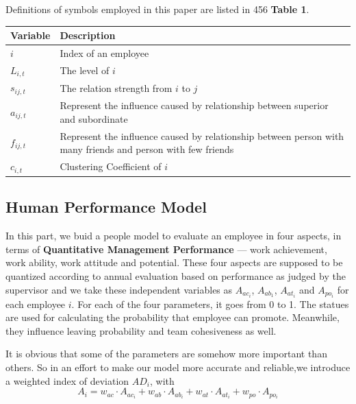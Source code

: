 \documentclass[12pt,a4paper,titlepage]{article}
\begin{document}
Definitions of symbols employed in this paper are listed in 456
\textbf{Table 1}.
\begin{table}
\begin{tabular}{|l|l|}
  Variable & Description \\
  \hline
  $i$            &Index of an employee \\
  $L_{i,t}$          &The level of $i$ \\
  $s_{ij,t}$        &The relation strength from $i$ to $j$ \\
  $a_{ij,t}$        &Represent the influence caused by relationship
                    between superior and subordinate \\
  $f_{ij,t}$        &Represent the influence caused by relationship
                    between person with many friends and person with
                    few friends \\
  $c_{i,t}$        &Clustering Coefficient of $i$
\end{tabular}
\end{table}

\subsection{Human Performance Model}
\label{sec:human-model}

In this part, we buid a people model to evaluate an employee in four
aspects, in terms of \textbf{Quantitative Management Performance} ---
work achievement, work ability, work attitude and potential. These
four aspects are supposed to be quantized according to annual
evaluation based on performance as judged by the supervisor and we
take these independent variables as $A_{ac_i}$, $A_{ab_1}$, $A_{at_i}$
and $A_{po_i}$ for each employee $i$. For each of the four parameters,
it goes from 0 to 1. The statues are used for calculating the
probability that employee can promote. Meanwhile, they influence
leaving probability and team cohesiveness as well.

It is obvious that some of the parameters are somehow more important
than others. So in an effort to make our model more accurate and
reliable,we introduce a weighted index of deviation $AD_i$, with
\begin{equation}
  A_i=w_{ac} \cdot A_{ac_i} + w_{ab} \cdot A_{ab_i} + w_{at} \cdot A_{at_i} +
  w_{po} \cdot A_{po_i}
\end{equation}
\end{document}
